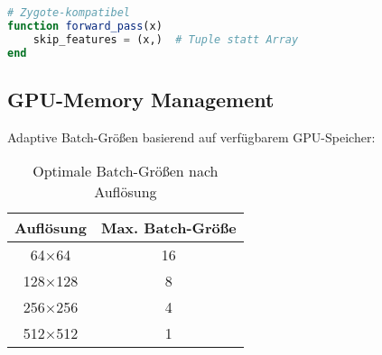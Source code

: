 \begin{lstlisting}[language=Julia, caption={Lösung: Immutable Operations}]
# Zygote-kompatibel
function forward_pass(x)
    skip_features = (x,)  # Tuple statt Array
end
\end{lstlisting}

\subsection{GPU-Memory Management}

Adaptive Batch-Größen basierend auf verfügbarem GPU-Speicher:

\begin{table}[htbp]
\centering
\caption{Optimale Batch-Größen nach Auflösung}
\label{tab:batch_sizes}
\begin{tabular}{@{}cc@{}}
\toprule
\textbf{Auflösung} & \textbf{Max. Batch-Größe} \\
\midrule
64×64 & 16 \\
128×128 & 8 \\
256×256 & 4 \\
512×512 & 1 \\
\bottomrule
\end{tabular}
\end{table}